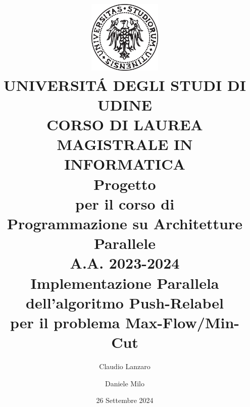 \documentclass[a4paper]{report}
\begin{document}
	
	\title{
		\includegraphics[width=35mm]{logo_UNIUD.png}\\[4mm]
		\LARGE{UNIVERSIT\'A DEGLI STUDI DI UDINE}\\[4mm]
		\LARGE{CORSO DI LAUREA MAGISTRALE IN INFORMATICA}\\[1cm]
		\LARGE{Progetto}\\[2mm]
		\Large{per il corso di}\\[2mm]
		\LARGE{Programmazione su Architetture Parallele}\\[4mm]
		\Large{A.A. 2023-2024}\\[1cm]
		\LARGE{Implementazione Parallela dell'algoritmo Push-Relabel \\per il problema Max-Flow/Min-Cut}
 		}
 	\author{Claudio Lanzaro \and Daniele Milo}
	\date{26 Settembre 2024}
	\maketitle
	
	\tableofcontents	
	
    

    

    

    

    

    \begin{appendices}

        

        

    \end{appendices}

    \printbibliography[title=Riferimenti]
    
\end{document}
